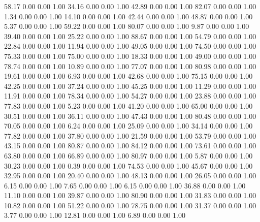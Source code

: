    58.17   0.00   0.00   1.00
   34.16   0.00   0.00   1.00
   42.89   0.00   0.00   1.00
   82.07   0.00   0.00   1.00
    1.34   0.00   0.00   1.00
   14.10   0.00   0.00   1.00
   42.44   0.00   0.00   1.00
   48.87   0.00   0.00   1.00
    5.37   0.00   0.00   1.00
   59.22   0.00   0.00   1.00
   80.07   0.00   0.00   1.00
    9.87   0.00   0.00   1.00
   39.40   0.00   0.00   1.00
   25.22   0.00   0.00   1.00
   88.67   0.00   0.00   1.00
   54.79   0.00   0.00   1.00
   22.84   0.00   0.00   1.00
   11.94   0.00   0.00   1.00
   49.05   0.00   0.00   1.00
   74.50   0.00   0.00   1.00
   75.33   0.00   0.00   1.00
   75.00   0.00   0.00   1.00
   18.33   0.00   0.00   1.00
   49.00   0.00   0.00   1.00
   78.74   0.00   0.00   1.00
   10.89   0.00   0.00   1.00
   77.07   0.00   0.00   1.00
   80.98   0.00   0.00   1.00
   19.61   0.00   0.00   1.00
    6.93   0.00   0.00   1.00
   42.68   0.00   0.00   1.00
   75.15   0.00   0.00   1.00
   42.25   0.00   0.00   1.00
   37.24   0.00   0.00   1.00
   45.25   0.00   0.00   1.00
   11.29   0.00   0.00   1.00
   11.91   0.00   0.00   1.00
   78.34   0.00   0.00   1.00
   54.27   0.00   0.00   1.00
   23.88   0.00   0.00   1.00
   77.83   0.00   0.00   1.00
    5.23   0.00   0.00   1.00
   41.20   0.00   0.00   1.00
   65.00   0.00   0.00   1.00
   30.51   0.00   0.00   1.00
   36.11   0.00   0.00   1.00
   47.43   0.00   0.00   1.00
   80.48   0.00   0.00   1.00
   70.05   0.00   0.00   1.00
    6.24   0.00   0.00   1.00
   25.09   0.00   0.00   1.00
   34.14   0.00   0.00   1.00
   77.82   0.00   0.00   1.00
   37.80   0.00   0.00   1.00
   21.59   0.00   0.00   1.00
   53.79   0.00   0.00   1.00
   43.15   0.00   0.00   1.00
   80.87   0.00   0.00   1.00
   84.12   0.00   0.00   1.00
   73.61   0.00   0.00   1.00
   63.80   0.00   0.00   1.00
   66.89   0.00   0.00   1.00
   80.97   0.00   0.00   1.00
    5.87   0.00   0.00   1.00
   30.23   0.00   0.00   1.00
    0.39   0.00   0.00   1.00
   74.53   0.00   0.00   1.00
   45.67   0.00   0.00   1.00
   32.95   0.00   0.00   1.00
   20.40   0.00   0.00   1.00
   48.13   0.00   0.00   1.00
   26.05   0.00   0.00   1.00
    6.15   0.00   0.00   1.00
    7.65   0.00   0.00   1.00
    6.15   0.00   0.00   1.00
   36.88   0.00   0.00   1.00
   11.10   0.00   0.00   1.00
   39.87   0.00   0.00   1.00
   80.90   0.00   0.00   1.00
   31.83   0.00   0.00   1.00
   10.82   0.00   0.00   1.00
   51.22   0.00   0.00   1.00
   78.75   0.00   0.00   1.00
   31.37   0.00   0.00   1.00
    3.77   0.00   0.00   1.00
   12.81   0.00   0.00   1.00
    6.89   0.00   0.00   1.00
